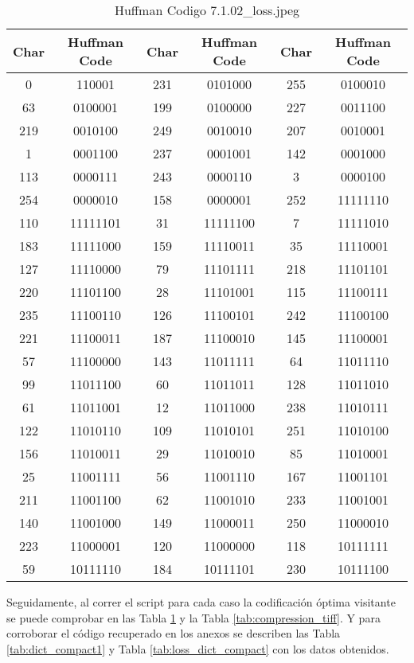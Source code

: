 \documentclass[conference,onecolumn,12pt]{IEEEtran}
\numberwithin{equation}{subsection}
\begin{document}
\begin{table}
\centering
\caption{Huffman Codigo 7.1.02_loss.jpeg}
\label{tab:compression_jpeg}
\begin{tabular}{|c|c||c|c||c|c|}
\hline
Char & Huffman Code & Char & Huffman Code & Char & Huffman Code \\
\hline
0 & 110001 & 231 & 0101000 & 255 & 0100010 \\
63 & 0100001 & 199 & 0100000 & 227 & 0011100 \\
219 & 0010100 & 249 & 0010010 & 207 & 0010001 \\
1 & 0001100 & 237 & 0001001 & 142 & 0001000 \\
113 & 0000111 & 243 & 0000110 & 3 & 0000100 \\
254 & 0000010 & 158 & 0000001 & 252 & 11111110 \\
110 & 11111101 & 31 & 11111100 & 7 & 11111010 \\
183 & 11111000 & 159 & 11110011 & 35 & 11110001 \\
127 & 11110000 & 79 & 11101111 & 218 & 11101101 \\
220 & 11101100 & 28 & 11101001 & 115 & 11100111 \\
235 & 11100110 & 126 & 11100101 & 242 & 11100100 \\
221 & 11100011 & 187 & 11100010 & 145 & 11100001 \\
57 & 11100000 & 143 & 11011111 & 64 & 11011110 \\
99 & 11011100 & 60 & 11011011 & 128 & 11011010 \\
61 & 11011001 & 12 & 11011000 & 238 & 11010111 \\
122 & 11010110 & 109 & 11010101 & 251 & 11010100 \\
156 & 11010011 & 29 & 11010010 & 85 & 11010001 \\
25 & 11001111 & 56 & 11001110 & 167 & 11001101 \\
211 & 11001100 & 62 & 11001010 & 233 & 11001001 \\
140 & 11001000 & 149 & 11000011 & 250 & 11000010 \\
223 & 11000001 & 120 & 11000000 & 118 & 10111111 \\
59 & 10111110 & 184 & 10111101 & 230 & 10111100 \\
\hline
\end{tabular}
\end{table}

Seguidamente, al correr el script para cada caso la codificación óptima visitante se puede comprobar en las Tabla \ref{tab:compression_jpeg} y la Tabla \ref{tab:compression_tiff}. Y para corroborar el código recuperado en los anexos se describen las Tabla \ref{tab:dict_compact1} y Tabla \ref{tab:loss_dict_compact} con los datos obtenidos.
\end{document}
